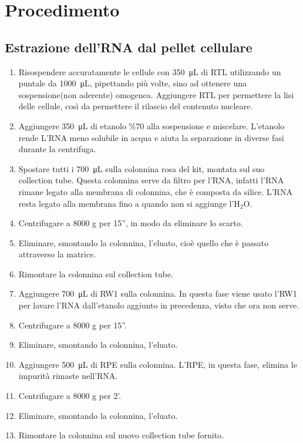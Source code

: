 \section{Procedimento}

\subsection{Estrazione dell'RNA dal pellet cellulare}
\begin{enumerate}

\item Risospendere accuratamente le cellule con \SI{350}{\micro\liter} di RTL
utilizzando un puntale da \SI{1000}{\micro\liter}, pipettando più volte,
sino ad ottenere una sospensione(non aderente) omogenea.
Aggiungere RTL per permettere la lisi delle cellule,
così da permettere il rilascio del contenuto nucleare.
\item Aggiungere \SI{350}{\micro\liter} di etanolo \%70 alla sospensione e miscelare.
L'etanolo rende L'RNA meno solubile in acqua e aiuta la separazione in diverse fasi durante la centrifuga.
\item Spostare tutti i \SI{700}{\micro\liter} sulla colonnina rosa del kit,
montata sul suo collection tube.
Questa colonnina serve da filtro per l'RNA, infatti l'RNA rimane legato alla
membrana di colonnina, che è composta da silice.
L'RNA resta legato alla membrana fino a quando non si aggiunge l'H$_2$O.
\item Centrifugare a 8000 g per 15'', in modo da eliminare lo scarto.
\item Eliminare, smontando la colonnina, l'eluato, cioè quello che è passato attraverso la matrice.
\item Rimontare la colonnina sul collection tube.
\item Aggiungere \SI{700}{\micro\liter} di RW1 sulla colonnina.
In questa fase viene usato l'RW1 per lavare l'RNA dall'etanolo aggiunto in precedenza,
visto che ora non serve.
\item Centrifugare a 8000 g per 15''.
\item Eliminare, smontando la colonnina, l'eluato.
\item Aggiungere  \SI{500}{\micro\liter} di RPE sulla colonnina.
L'RPE, in questa fase, elimina le impurità rimaste nell'RNA.
\item Centrifugare a 8000 g per 2'.
\item Eliminare, smontando la colonnina, l'eluato.
\item Rimontare la colonnina sul nuovo collection tube fornito.

\end{enumerate}
